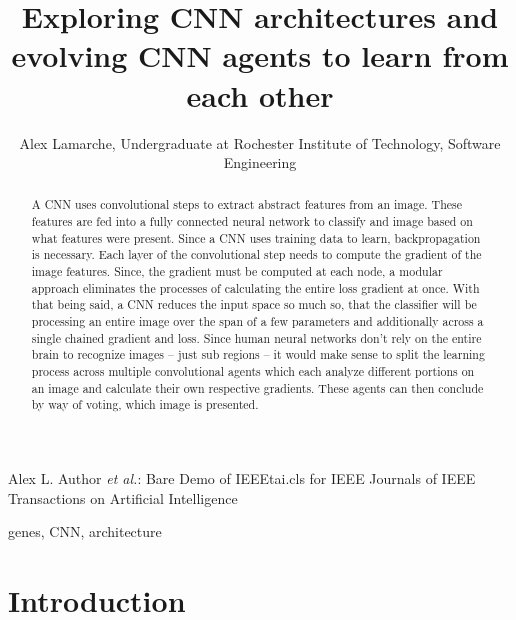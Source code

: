 \documentclass[journal]{IEEEtai}
\begin{document}
\title{Exploring CNN architectures and evolving CNN agents to learn from each other} 


\author{Alex Lamarche, Undergraduate at Rochester Institute of Technology, Software Engineering}

{Alex L. Author \MakeLowercase{\textit{et al.}}: Bare Demo of IEEEtai.cls for IEEE Journals of IEEE Transactions on Artificial Intelligence}

\maketitle

\begin{abstract}
A CNN uses convolutional steps to extract abstract features from an image. These features are fed into a fully connected neural network to classify and image based on what features were present. Since a CNN uses training data to learn, backpropagation is necessary. Each layer of the convolutional step needs to compute the gradient of the image features. Since, the gradient must be computed at each node, a modular approach eliminates the processes of calculating the entire loss gradient at once. With that being said, a CNN reduces the input space so much so, that the classifier will be processing an entire image over the span of a few parameters and additionally across a single chained gradient and loss. Since human neural networks don’t rely on the entire brain to recognize images – just sub regions – it would make sense to split the learning process across multiple convolutional agents which each analyze different portions on an image and calculate their own respective gradients. These agents can then conclude by way of voting, which image is presented. 
\end{abstract}

\begin{IEEEkeywords}
genes, CNN, architecture
\end{IEEEkeywords}

\section{Introduction}
\end{document}
